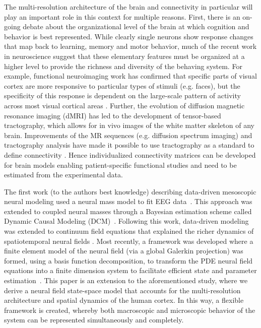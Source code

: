 \documentclass[review,authoryear,3p]{elsarticle}
\begin{document}
The multi-resolution architecture of the brain and connectivity in particular will play an important role in this context for multiple reasons. First, there is an on-going debate about the organizational level of the brain at which cognition and behavior is best represented. While clearly single neurons show response changes that map back to learning, memory and motor behavior, much of the recent work in neuroscience suggest that these elementary features must be organized at a higher level to provide the richness and diversity of the behaving system.  For example, functional neuroimaging work has confirmed that specific parts of visual cortex are more responsive to particular types of stimuli (e.g. faces), but the specificity of this response is dependent on the large-scale pattern of activity across most visual cortical areas \citep{Haxby2001}. Further, the evolution of diffusion magnetic resonance imaging (dMRI) has led to the development of tensor-based tractography, which allows for in vivo images of the white matter skeleton of any brain.  Improvements of the MR sequences (e.g. diffusion spectrum imaging) and tractography analysis have made it possible to use tractography as a standard to define connectivity \citep{Hagmann2008}. Hence individualized connectivity matrices can be developed for brain models enabling patient-specific functional studies and need to be estimated from the experimental data.                          

The first work (to the authors best knowledge) describing data-driven mesoscopic neural modeling used a neural mass model to fit EEG data~\citep{Valdes1999}. This approach was extended to coupled neural masses through a Bayesian estimation scheme called Dynamic Causal Modeling (DCM)~\citep{David2003}. Following this work, data-driven modeling was extended to continuum field equations that explained the richer dynamics of spatiotemporal neural fields \citep{Galka2008,schiff2008kalman,Daunizeau2009, Pinotsis2012}. Most recently, a framework was developed where a finite element model of the neural field (via a global Galerkin projection) was formed, using a basis function decomposition, to transform the PDE neural field equations into a finite dimension system to facilitate efficient state and parameter estimation~\citep{Freestone2011}. This paper is an extension to the aforementioned study, where we derive a neural field state-space model that accounts for the multi-resolution architecture and spatial dynamics of the human cortex. In this way, a flexible framework is created, whereby both macroscopic and microscopic behavior of the system can be represented simultaneously and completely.
\end{document}
